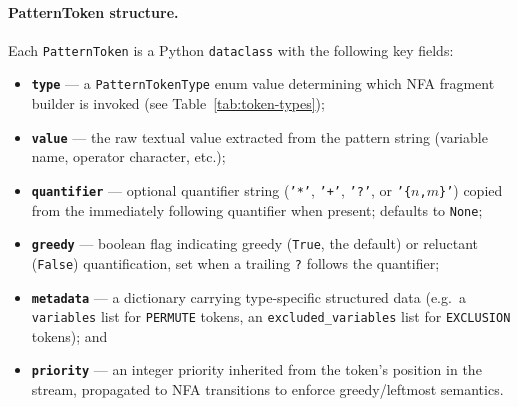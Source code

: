 \paragraph{PatternToken structure.}
Each \texttt{PatternToken} is a Python \texttt{dataclass} with the
following key fields:

\begin{itemize}
  \item \textbf{\texttt{type}} — a \texttt{PatternTokenType} enum
    value determining which NFA fragment builder is invoked
    (see Table~\ref{tab:token-types});
  \item \textbf{\texttt{value}} — the raw textual value extracted
    from the pattern string (variable name, operator character, etc.);
  \item \textbf{\texttt{quantifier}} — optional quantifier string
    (\texttt{'*'}, \texttt{'+'}, \texttt{'?'}, or
    \texttt{'\{$n$,$m$\}'}) copied from the immediately following
    quantifier when present; defaults to \texttt{None};
  \item \textbf{\texttt{greedy}} — boolean flag indicating greedy
    (\texttt{True}, the default) or reluctant (\texttt{False})
    quantification, set when a trailing \texttt{?} follows the
    quantifier;
  \item \textbf{\texttt{metadata}} — a dictionary carrying
    type-specific structured data (e.g.\ a \texttt{variables} list
    for \texttt{PERMUTE} tokens, an \texttt{excluded\_variables}
    list for \texttt{EXCLUSION} tokens); and
  \item \textbf{\texttt{priority}} — an integer priority inherited
    from the token's position in the stream, propagated to NFA
    transitions to enforce greedy/leftmost semantics.
\end{itemize}

